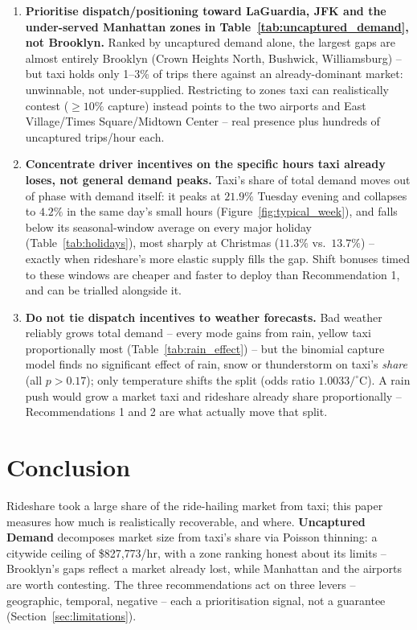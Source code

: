 \documentclass[11pt]{article}
\begin{document}
\begin{enumerate}
\item \label{rec:reallocate} \textbf{Prioritise dispatch/positioning toward LaGuardia, JFK and the under-served Manhattan zones in Table~\ref{tab:uncaptured_demand}, not Brooklyn.} Ranked by uncaptured demand alone, the largest gaps are almost entirely Brooklyn (Crown Heights North, Bushwick, Williamsburg) -- but taxi holds only 1--3\% of trips there against an already-dominant market: unwinnable, not under-supplied. Restricting to zones taxi can realistically contest ($\geq10\%$ capture) instead points to the two airports and East Village/Times Square/Midtown Center -- real presence plus hundreds of uncaptured trips/hour each.

\item \textbf{Concentrate driver incentives on the specific hours taxi already loses, not general demand peaks.} Taxi's share of total demand moves out of phase with demand itself: it peaks at $21.9\%$ Tuesday evening and collapses to $4.2\%$ in the same day's small hours (Figure~\ref{fig:typical_week}), and falls below its seasonal-window average on every major holiday (Table~\ref{tab:holidays}), most sharply at Christmas ($11.3\%$ vs.\ $13.7\%$) -- exactly when rideshare's more elastic supply fills the gap. Shift bonuses timed to these windows are cheaper and faster to deploy than Recommendation 1, and can be trialled alongside it.

\item \textbf{Do not tie dispatch incentives to weather forecasts.} Bad weather reliably grows total demand -- every mode gains from rain, yellow taxi proportionally most (Table~\ref{tab:rain_effect}) -- but the binomial capture model finds no significant effect of rain, snow or thunderstorm on taxi's \emph{share} (all $p>0.17$); only temperature shifts the split (odds ratio $1.0033/^\circ$C). A rain push would grow a market taxi and rideshare already share proportionally -- Recommendations 1 and 2 are what actually move that split.
\end{enumerate}

\FloatBarrier
\section{Conclusion}

Rideshare took a large share of the ride-hailing market from taxi; this paper measures how much is realistically recoverable, and where. \textbf{Uncaptured Demand} decomposes market size from taxi's share via Poisson thinning: a citywide ceiling of \$827{,}773/hr, with a zone ranking honest about its limits -- Brooklyn's gaps reflect a market already lost, while Manhattan and the airports are worth contesting. The three recommendations act on three levers -- geographic, temporal, negative -- each a prioritisation signal, not a guarantee (Section~\ref{sec:limitations}).


\clearpage

\printbibliography
\end{document}
